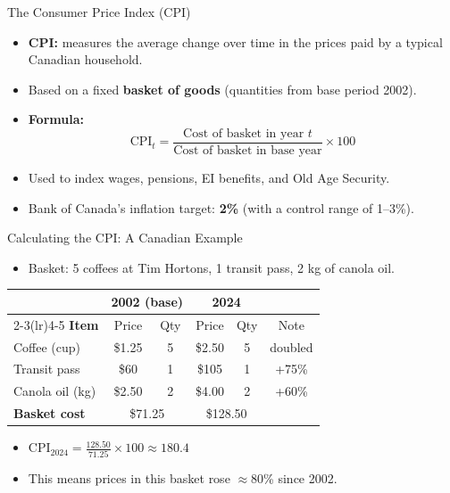 \documentclass[aspectratio=169]{beamer}
\begin{document}
\begin{frame}{The Consumer Price Index (CPI)}
\transfade
\begin{itemize}[<+->]
  \item \textbf{CPI:} measures the average change over time in the prices paid by a typical Canadian household.
  \item Based on a fixed \textbf{basket of goods} (quantities from base period 2002).
  \item \textbf{Formula:}
  \[
    \text{CPI}_t = \frac{\text{Cost of basket in year } t}{\text{Cost of basket in base year}} \times 100
  \]
  \item Used to index wages, pensions, EI benefits, and Old Age Security.
  \item Bank of Canada's inflation target: \textbf{2\%} (with a control range of 1--3\%).
\end{itemize}
\end{frame}

\begin{frame}{Calculating the CPI: A Canadian Example}
\transfade
\small
\begin{itemize}[<+->]
  \item Basket: 5 coffees at Tim Hortons, 1 transit pass, 2 kg of canola oil.
\end{itemize}
\vspace{0.3em}
\renewcommand{\arraystretch}{1.3}
\begin{tabular}{lccccc}
\toprule
 & \multicolumn{2}{c}{\textbf{2002 (base)}} & \multicolumn{2}{c}{\textbf{2024}} & \\
\cmidrule(lr){2-3}\cmidrule(lr){4-5}
\textbf{Item} & Price & Qty & Price & Qty & Note \\
\midrule
Coffee (cup) & \$1.25 & 5 & \$2.50 & 5 & doubled \\
Transit pass & \$60 & 1 & \$105 & 1 & +75\% \\
Canola oil (kg) & \$2.50 & 2 & \$4.00 & 2 & +60\% \\
\midrule
\textbf{Basket cost} & \multicolumn{2}{c}{\$71.25} & \multicolumn{2}{c}{\$128.50} & \\
\bottomrule
\end{tabular}
\begin{itemize}[<+->]
  \item $\text{CPI}_{2024} = \frac{128.50}{71.25} \times 100 \approx \mathbf{180.4}$
  \item This means prices in this basket rose $\approx$80\% since 2002.
\end{itemize}
\end{frame}
\end{document}
